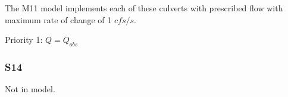 The M11 model implements each of these culverts with prescribed flow with maximum rate of change of 1 $cfs/s$.

\begin{packed_items}
\item Priority 1: $Q = Q_{obs}$
\end{packed_items}


%
%
%
%
%


\clearpage
\subsubsection{S14}
Not in model.

